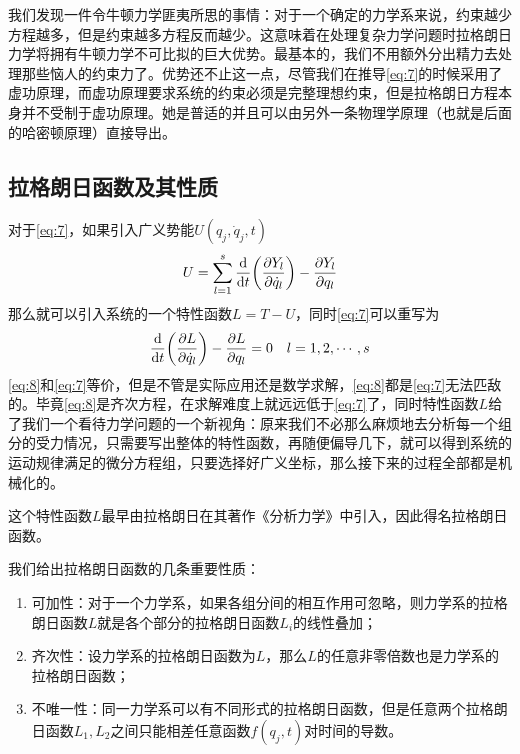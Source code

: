         我们发现一件令牛顿力学匪夷所思的事情：对于一个确定的力学系来说，约束越少方程越多，但是约束越多方程反而越少。这意味着在处理复杂力学问题时拉格朗日力学将拥有牛顿力学不可比拟的巨大优势。最基本的，我们不用额外分出精力去处理那些恼人的约束力了。优势还不止这一点，尽管我们在推导\ref{eq:7}的时候采用了虚功原理，而虚功原理要求系统的约束必须是完整理想约束，但是拉格朗日方程本身并不受制于虚功原理。她是普适的并且可以由另外一条物理学原理（也就是后面的哈密顿原理）直接导出。

            \subsection{拉格朗日函数及其性质}
            对于\ref{eq:7}，如果引入广义势能$U(q_j,\dot{q}_j,t)$
            \[
            U=\sum_{l=1}^{s}\dv{t}(\pdv{Y_l}{\dot{q}_l})-\pdv{Y_l}{q_l}
            \]
            那么就可以引入系统的一个特性函数$L=T-U$，同时\ref{eq:7}可以重写为
            \begin{equation}
                \label{eq:8}
                \dv{t}(\pdv{L}{\dot{q}_l})-\pdv{L}{q_l} = 0 \quad l=1,2,\cdots,s
            \end{equation}
            \ref{eq:8}和\ref{eq:7}等价，但是不管是实际应用还是数学求解，\ref{eq:8}都是\ref{eq:7}无法匹敌的。毕竟\ref{eq:8}是齐次方程，在求解难度上就远远低于\ref{eq:7}了，同时特性函数$L$给了我们一个看待力学问题的一个新视角：原来我们不必那么麻烦地去分析每一个组分的受力情况，只需要写出整体的特性函数，再随便偏导几下，就可以得到系统的运动规律满足的微分方程组，只要选择好广义坐标，那么接下来的过程全部都是机械化的。

            这个特性函数$L$最早由拉格朗日在其著作《分析力学》中引入，因此得名拉格朗日函数。

            我们给出拉格朗日函数的几条重要性质：
            \begin{enumerate}
                \item 可加性：对于一个力学系，如果各组分间的相互作用可忽略，则力学系的拉格朗日函数$L$就是各个部分的拉格朗日函数$L_i$的线性叠加；
                \item 齐次性：设力学系的拉格朗日函数为$L$，那么$L$的任意非零倍数也是力学系的拉格朗日函数；
                \item 不唯一性：同一力学系可以有不同形式的拉格朗日函数，但是任意两个拉格朗日函数$L_1,L_2$之间只能相差任意函数$f(q_j,t)$对时间的导数。
            \end{enumerate}
            

